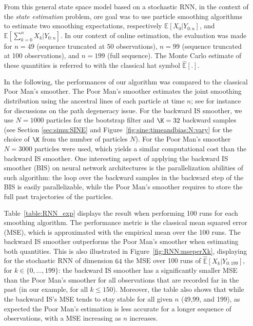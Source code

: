 \documentclass{article}
\newcounter{example}[section]
\begin{document}
 From this general state space model based on a stochastic RNN, in the context of the \textit{state estimation} problem, ore goal was to use particle smoothing algorithms to estimate two smoothing expectations, respectively $\mathbb{E}[X_0|Y_{0:n}]$, and $\mathbb{E}[\sum_{k=0}^{n} X_k|Y_{0:n}]$. 
 In our context of online estimation, the evaluation was made for $n=49$ (sequence truncated at 50 observations), $n=99$ (sequence truncated at 100 observations), and $n=199$ (full sequence). 
  The Monte Carlo  estimate of these quantities is referred to with the classical hat symbol $\mathbb{\widehat{E}}[.]$. 

In the following, the performances of our algorithm was compared to the classical Poor Man's smoother. 
The  Poor Man's smoother estimates the joint smoothing distribution using the ancestral lines of each particle at time $n$; see for instance \cite{douc2014nonlinear} for discussions on the path degeneracy issue.
For the backward IS smoother, we use $N=1000$ particles for the bootstrap filter and $\K=32$ backward samples (see Section \ref{sec:simu:SINE} and Figure~\ref{fig:sine:timeandbias:N:vary} for the choice of $\K$ from the number of particles $N$). 
For the Poor Man's smoother $N=3000$ particles were used, which yields a similar computational cost than the backward IS smoother. 
One interesting aspect of applying the backward IS smoother (BIS) on neural network architectures is the parallelization abilities of such algorithm: the loop over the backward samples in the backward step of the BIS is easily parallelizable, while the Poor Man's smoother requires to store the full past trajectories of the particles. 

Table~\ref{table:RNN_exp} displays the result when performing 100 runs for each smoothing algorithm. 
The performance metric is the classical mean squared error (MSE), which is approximated with the empirical mean over the 100 runs.
The backward IS smoother outperforms the Poor Man's smoother when estimating both quantities. 
This is also illustrated in Figure~\ref{fig:RNN:mseperXk}, displaying for the stochastic RNN of dimension $64$ the MSE over 100 runs of $\mathbb{\widehat{E}}[X_k|Y_{0:199}]$, for $k \in \{0,...,199\}$: the backward IS smoother has a significantly  smaller MSE than the Poor Man's smoother for all observations that are recorded far in the past (in our example, for all $k \leqslant 150$).  
Moreover, the table also shows that while the backward IS's MSE tends to stay stable for all given $n$ (49,99, and 199), as expected the Poor Man's estimation is less accurate for a longer sequence of observations, with a MSE increasing as $n$ increases.
\end{document}
